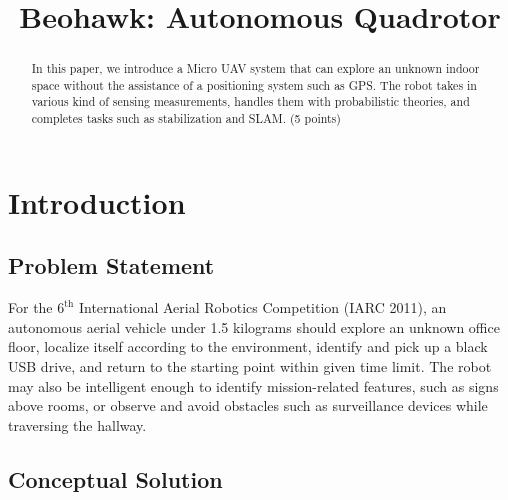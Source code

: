 \documentclass[12pt, letterpaper]{article}
\title{Beohawk: Autonomous Quadrotor}
\begin{document}
\maketitle
\begin{people}

\end{people}

\begin{abstract}
	In this paper, we introduce a Micro UAV system that can explore an unknown indoor space without the assistance of a positioning system such as GPS. The robot takes in various kind of sensing measurements, handles them with probabilistic theories, and completes tasks such as stabilization and SLAM.  (5 points)
\end{abstract}

\section{Introduction}

\subsection{Problem Statement}

For the $6^\text{th}$ International Aerial Robotics Competition (IARC 2011), an autonomous aerial vehicle under 1.5 kilograms should explore an unknown office floor, localize itself according to the environment, identify and pick up a black USB drive, and return to the starting point within given time limit. The robot may also be intelligent enough to identify mission-related features, such as signs above rooms, or observe and avoid obstacles such as surveillance devices while traversing the hallway.

\subsection{Conceptual Solution}
\end{document}
